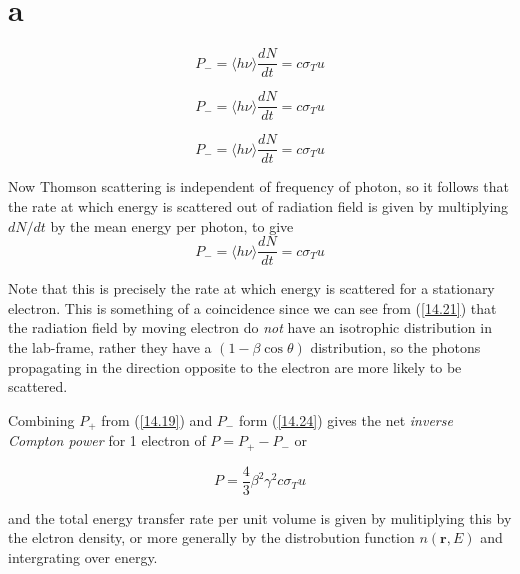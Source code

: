 \documentclass[a4paper,11pt,twoside]{article}
\begin{document}
	\section{a}
	
	\begin{equation}
	\label{14.21}
	P_{-} = \langle h\nu \rangle \frac{d N}{dt} = c\sigma_{T} u
	\tag{14.21}
	\end{equation}
	
	\begin{equation}
	\label{14.7}
	P_{-} = \langle h\nu \rangle \frac{d N}{dt} = c\sigma_{T} u
	\tag{14.7}
	\end{equation}
	
	\begin{equation}
	\label{14.19}
	P_{-} = \langle h\nu \rangle \frac{d N}{dt} = c\sigma_{T} u
	\tag{14.19}
	\end{equation}
	
	\newpage
	
	Now Thomson scattering is independent of frequency of photon, so it follows that the rate at which
	energy is scattered out of radiation field is given by multiplying $dN/dt$ by the mean energy per
	photon, to give
	\begin{equation}
	\label{14.24}
	P_{-} = \langle h\nu \rangle \frac{d N}{dt} = c\sigma_{T} u
	\tag{14.24}
	\end{equation}
	
	Note that this is precisely the rate at which energy is scattered for a stationary electron. This is
	something of a coincidence since we can see from (\ref{14.21}) that the radiation field by moving
	electron do \textit{not} have an isotrophic distribution in the lab-frame, rather they have a $( 1-
	\beta \cos \theta)$ distribution, so the photons propagating in the direction opposite to the electron
	are more likely to be scattered.
	
	Combining $P_{+} $ from (\ref{14.19}) and $ P_{-}$ form (\ref{14.24}) gives the net
	\textit{inverse Compton power} for 1 electron of $ P = P_+ - P_- $ or
	
	\begin{equation}
	\label{14.25}
	P = \frac{4}{3} \beta^2 \gamma^2 c \sigma_{T} u
	\tag{14.25}
	\end{equation}
	
	and the total energy transfer rate per unit volume is given by mulitiplying this by the elctron density,
	or more generally by the distrobution function $ n(\textbf{r},E)$ and intergrating over energy.
	
\end{document}
